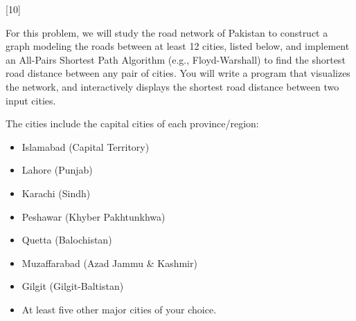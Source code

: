 \documentclass[a4paper]{exam}
\begin{document}
\begin{questions}


{}[10]

  For this problem, we will study the road network of Pakistan to construct a graph modeling the roads between at least 12 cities, listed below, and implement an All-Pairs Shortest Path Algorithm (e.g., Floyd-Warshall) to find the shortest road distance between any pair of cities. You will write a program that visualizes the network, and interactively displays the shortest road distance between two input cities.

  The cities include the capital cities of each province/region:
  \begin{itemize}
    \item Islamabad (Capital Territory)
    \item Lahore (Punjab)
    \item Karachi (Sindh)
    \item Peshawar (Khyber Pakhtunkhwa)
    \item Quetta (Balochistan)
    \item Muzaffarabad (Azad Jammu \& Kashmir)
    \item Gilgit (Gilgit-Baltistan)
    \item At least five other major cities of your choice.
  \end{itemize}

\end{questions}
\end{document}
